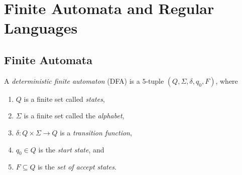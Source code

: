 \chapter{Finite Automata and Regular Languages}

\section{Finite Automata}

\begin{greybox}
\begin{definition}
A \emph{deterministic finite automaton} (DFA) is a $5$-tuple $(Q, \Sigma, \delta, q_0, F)$, where
\begin{enumerate}
    \item $Q$ is a finite set called \emph{states},
    \item $\Sigma$ is a finite set called the \emph{alphabet},
    \item $\delta : Q \times \Sigma \to Q$ is a \emph{transition function},
    \item $q_0 \in Q$ is the \emph{start state}, and
    \item $F \subseteq Q$ is the \emph{set of accept states}.
\end{enumerate}
\end{definition}
\end{greybox}

